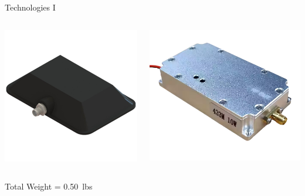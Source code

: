 \documentclass{beamer}
\begin{document}
    \begin{frame}{Technologies I}
    \begin{columns}
        \begin{column}{0.5\textwidth}
            \centering
            \includegraphics[width=.667\textwidth]{figures/market research/JammingAntenna.png} %
            \vspace{0.49em} %
        \end{column}

        \begin{column}{0.5\textwidth}
            \centering
            \includegraphics[width=.75\textwidth]{figures/market research/JammingModule.png} %
            \vspace{0.5em} %
        \end{column}
    \end{columns}
    \centering
    \vspace{0.5em}
    Total Weight = \qty{0.50}{lbs}
    \end{frame}
\end{document}
